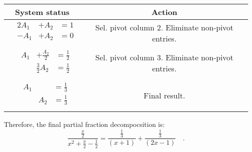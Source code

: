 {\begin{longtable}{cc} System status&Action \\\hline $\begin{array}{llll} & 2A_{1} & +A_{2} & =1\\ & -A_{1} & +A_{2} & =0\\\end{array}$ & Sel. pivot column 2. Eliminate non-pivot entries. \\\hline $\begin{array}{llll} & A_{1} & +\frac{A_{2} }{2} & =\frac{1}{2}\\ & & \frac{3}{2}A_{2} & =\frac{1}{2}\\\end{array}$& Sel. pivot column 3. Eliminate non-pivot entries. \\\hline $\begin{array}{llll} & A_{1} & & =\frac{1}{3}\\ & & A_{2} & =\frac{1}{3}\\\end{array}$& Final result.\\ \end{longtable}
Therefore, the final partial fraction decompocsition is: 
\[
\frac{\frac{x }{2}}{x^{2}+\frac{x }{2} -\frac{1}{2} } =\frac{ \frac{ 1}{3}}{(x +1)}+ \frac{\frac{1}{3}}{(2x -1)}\quad .
\]
}

